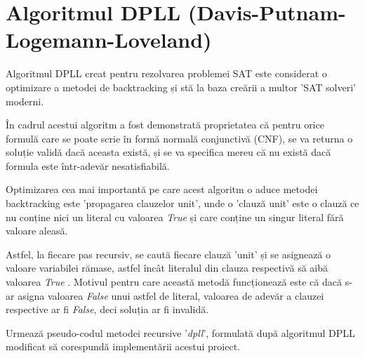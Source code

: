 

\chapter{Algoritmul DPLL (Davis-Putnam-Logemann-Loveland)}

Algoritmul DPLL creat pentru rezolvarea problemei SAT este considerat o \linebreak optimizare a metodei de backtracking și stă la baza creării a multor 'SAT solveri' \linebreak moderni.

În cadrul acestui algoritm a fost demonstrată proprietatea că pentru orice formulă care se poate scrie în formă normală conjunctivă (CNF), se va returna o soluție validă dacă aceasta există, și se va specifica mereu că nu există dacă formula este într-adevăr nesatisfiabilă.

Optimizarea cea mai importantă pe care acest algoritm o aduce metodei \linebreak backtracking este 'propagarea clauzelor unit', unde o 'clauză unit' este o clauză ce nu conține nici un literal cu valoarea \textit{ True } și care conține un singur literal fără valoare aleasă. 

Astfel, la fiecare pas recursiv, se caută fiecare clauză 'unit' și se asignează o \linebreak valoare variabilei rămase, astfel încât literalul din clauza respectivă să aibă \linebreak valoarea \textit{ True }. Motivul pentru care această metodă funcționează este că dacă s-ar asigna valoarea \textit{False} unui astfel de literal, valoarea de adevăr a clauzei respective ar fi \textit{False}, deci soluția ar fi invalidă.

Urmează pseudo-codul metodei recursive '\textit{dpll}', formulată după algoritmul DPLL modificat să corespundă implementării acestui proiect.


